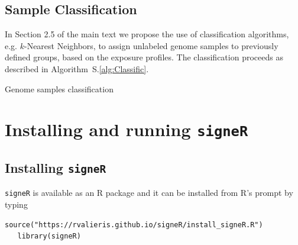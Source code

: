 \documentclass[11pt]{amsart}
\makeatletter
\def\BState{\State\hskip-\ALG@thistlm}
\theoremstyle{definition}
\makeatother
\begin{document}
\subsection{Sample Classification}
In Section 2.5 of the main text we propose the use of classification
algorithms, e.g. $k$-Nearest Neighbors, to assign unlabeled genome
samples to previously defined groups, based on the exposure profiles.
The classification proceeds as described in
Algorithm~S.\ref{alg:Classific}.

\begin{algorithm}
\caption{Genome samples classification}\label{alg:Classific}
\end{algorithm}


\section{Installing and running \texttt{signeR}}
\subsection{Installing \texttt{signeR}}
\texttt{signeR} is available as an R package and it can be installed
from R's prompt by typing
\begin{lstlisting}[]
   source("https://rvalieris.github.io/signeR/install_signeR.R")
   library(signeR)
\end{lstlisting}
\end{document}
